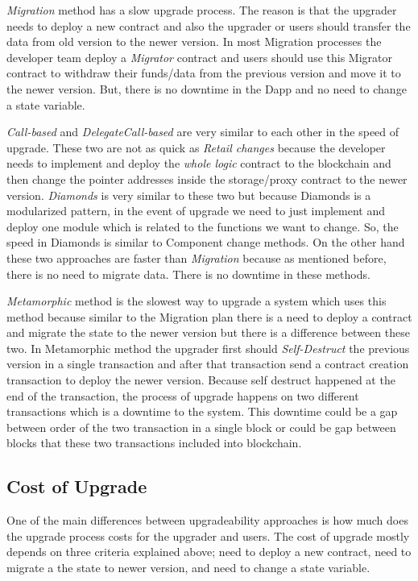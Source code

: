 \textit{Migration} method has a slow upgrade process. The reason is that the upgrader needs to deploy a new contract and also the upgrader or users should transfer the data from old version to the newer version. In most Migration processes the developer team deploy a \textit{Migrator} contract and users should use this Migrator contract to withdraw their funds/data from the previous version and move it to the newer version. But, there is no downtime in the Dapp and no need to change a state variable.

\textit{Call-based} and \textit{DelegateCall-based} are very similar to each other in the speed of upgrade. These two are not as quick as \textit{Retail changes} because the developer needs to implement and deploy the \textit{whole logic} contract to the blockchain and then change the pointer addresses inside the storage/proxy contract to the newer version. \textit{Diamonds} is very similar to these two but because Diamonds is a modularized pattern, in the event of upgrade we need to just implement and deploy one module which is related to the functions we want to change. So, the speed in Diamonds is similar to Component change methods.
On the other hand these two approaches are faster than \textit{Migration} because as mentioned before, there is no need to migrate data. There is no downtime in these methods.

\textit{Metamorphic} method is the slowest way to upgrade a system which uses this method because similar to the Migration plan there is a need to deploy a contract and migrate the state to the newer version but there is a difference between these two. In Metamorphic method the upgrader first should \textit{Self-Destruct} the previous version in a single transaction and after that transaction send a contract creation transaction to deploy the newer version. Because self destruct happened at the end of the transaction, the process of upgrade happens on two different transactions which is a downtime to the system. This downtime could be a gap between order of the two transaction in a single block or could be gap between blocks that these two transactions included into blockchain. 



\subsection{Cost of Upgrade}

 One of the main differences between upgradeability approaches is how much does the upgrade process costs for the upgrader and users. The cost of upgrade mostly depends on three criteria explained above; need to deploy a new contract, need to migrate a the state to newer version, and need to change a state variable.

